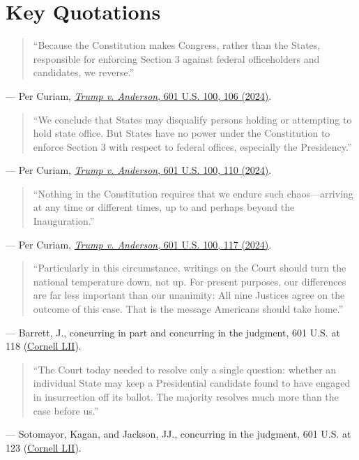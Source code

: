 \documentclass[12pt]{article}
\begin{document}
\section{Key Quotations}
\begin{quote}
``Because the Constitution makes Congress, rather than the States, responsible for enforcing Section 3 against federal officeholders and candidates, we reverse.''
\end{quote}
\noindent --- Per Curiam, \href{https://www.law.cornell.edu/supremecourt/text/23-719}{\emph{Trump v. Anderson}, 601 U.S. 100, 106 (2024)}.

\begin{quote}
``We conclude that States may disqualify persons holding or attempting to hold state office. But States have no power under the Constitution to enforce Section 3 with respect to federal offices, especially the Presidency.''
\end{quote}
\noindent --- Per Curiam, \href{https://www.law.cornell.edu/supremecourt/text/23-719}{\emph{Trump v. Anderson}, 601 U.S. 100, 110 (2024)}.

\begin{quote}
``Nothing in the Constitution requires that we endure such chaos---arriving at any time or different times, up to and perhaps beyond the Inauguration.''
\end{quote}
\noindent --- Per Curiam, \href{https://www.law.cornell.edu/supremecourt/text/23-719}{\emph{Trump v. Anderson}, 601 U.S. 100, 117 (2024)}.

\begin{quote}
``Particularly in this circumstance, writings on the Court should turn the national temperature down, not up. For present purposes, our differences are far less important than our unanimity: All nine Justices agree on the outcome of this case. That is the message Americans should take home.''
\end{quote}
\noindent --- Barrett, J., concurring in part and concurring in the judgment, 601 U.S. at 118 (\href{https://www.law.cornell.edu/supremecourt/text/23-719}{Cornell LII}).

\begin{quote}
``The Court today needed to resolve only a single question: whether an individual State may keep a Presidential candidate found to have engaged in insurrection off its ballot. The majority resolves much more than the case before us.''
\end{quote}
\noindent --- Sotomayor, Kagan, and Jackson, JJ., concurring in the judgment, 601 U.S. at 123 (\href{https://www.law.cornell.edu/supremecourt/text/23-719}{Cornell LII}).
\end{document}
